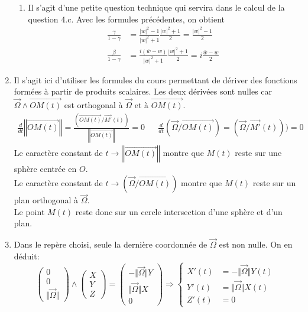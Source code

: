 \begin{enumerate}
\begin{enumerate}
\item Il s'agit d'une petite question technique qui servira dans le calcul de la question 4.c. Avec les formules précédentes, on obtient 
\begin{align*}
 \frac{\gamma}{1-\gamma} &= \frac{|w|^2-1}{|w|^2+1}\frac{|w|^2+1}{2}=\frac{|w|^2-1}{2} \\
 \frac{\beta}{1-\gamma} &= \frac{i(\overline{w}-w)}{|w|^2+1}\frac{|w|^2+1}{2}=i\frac{\overline{w}-w}{2} 
\end{align*}
\end{enumerate}

\item Il s'agit ici d'utiliser les formules du cours permettant de dériver des fonctions formées à partir de produits scalaires. Les deux dérivées sont nulles car $\overrightarrow\Omega \wedge \overrightarrow{OM(t)}$ est orthogonal à $\overrightarrow\Omega$ et à $\overrightarrow{OM(t)}$.
\begin{align*}
 \frac{d}{dt}\left\Vert\overrightarrow{OM(t)}\right\Vert = 
\frac{(\overrightarrow{OM(t)}/\overrightarrow{M'}(t))}{\left\Vert\overrightarrow{OM(t)}\right\Vert} = 0  & &
\frac{d}{dt}(\overrightarrow\Omega/\overrightarrow{OM(t)}) =
(\overrightarrow\Omega/\overrightarrow{M'}(t))) = 0
\end{align*}
Le caractère constant  de $t\rightarrow \left\Vert\overrightarrow{OM(t)}\right\Vert$ montre que $M(t)$ reste sur une sphère centrée en $O$.\\
Le caractère constant  de $t\rightarrow (\overrightarrow\Omega/\overrightarrow{OM(t)})$ montre que $M(t)$ reste sur un plan orthogonal à $\overrightarrow\Omega$.\\
Le point $M(t)$ reste donc sur un cercle intersection d'une sphère et d'un plan.
\item Dans le repère choisi, seule la dernière coordonnée de $\overrightarrow \Omega$ est non nulle. On en déduit:
\begin{displaymath}
 \begin{pmatrix}
  0\\
0\\
\Vert \overrightarrow \Omega\Vert
 \end{pmatrix}
\wedge
\begin{pmatrix}
 X\\
Y\\
Z
\end{pmatrix}
=
\begin{pmatrix}
-\Vert \overrightarrow \Omega\Vert Y \\
\Vert \overrightarrow \Omega\Vert X\\
0
\end{pmatrix}
\Rightarrow
\left\lbrace 
\begin{aligned}
X'(t) &= -\Vert \overrightarrow \Omega\Vert Y(t)\\
Y'(t) &= \Vert \overrightarrow \Omega\Vert X(t)\\
Z'(t) &= 0
\end{aligned}
\right. 
\end{displaymath}


\end{enumerate}
